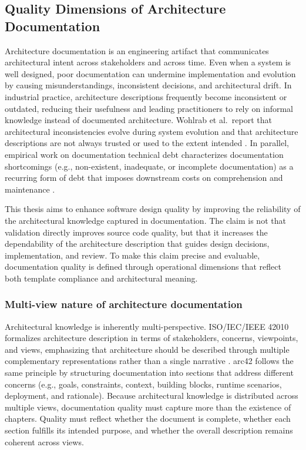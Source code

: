\subsection{Quality Dimensions of Architecture Documentation}
Architecture documentation is an engineering artifact that communicates architectural intent across stakeholders and across time. Even when a system is well designed, poor documentation can undermine implementation and evolution by causing misunderstandings, inconsistent decisions, and architectural drift. In industrial practice, architecture descriptions frequently become inconsistent or outdated, reducing their usefulness and leading practitioners to rely on informal knowledge instead of documented architecture. Wohlrab et al.\ report that architectural inconsistencies evolve during system evolution and that architecture descriptions are not always trusted or used to the extent intended \cite{wohlrab_icsa19_guidelines}. In parallel, empirical work on documentation technical debt characterizes documentation shortcomings (e.g., non-existent, inadequate, or incomplete documentation) as a recurring form of debt that imposes downstream costs on comprehension and maintenance \cite{mendes_doc_td}.

This thesis aims to enhance software design quality by improving the reliability of the architectural knowledge captured in documentation. The claim is not that validation directly improves source code quality, but that it increases the dependability of the architecture description that guides design decisions, implementation, and review. To make this claim precise and evaluable, documentation quality is defined through operational dimensions that reflect both template compliance and architectural meaning.

\subsubsection{Multi-view nature of architecture documentation}
Architectural knowledge is inherently multi-perspective. ISO/IEC/IEEE 42010 formalizes architecture description in terms of stakeholders, concerns, viewpoints, and views, emphasizing that architecture should be described through multiple complementary representations rather than a single narrative \cite{iso42010}. arc42 follows the same principle by structuring documentation into sections that address different concerns (e.g., goals, constraints, context, building blocks, runtime scenarios, deployment, and rationale).
Because architectural knowledge is distributed across multiple views, documentation quality must capture more than the existence of chapters. Quality must reflect whether the document is complete, whether each section fulfills its intended purpose, and whether the overall description remains coherent across views.

